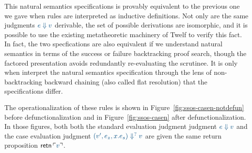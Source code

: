 This natural semantics specifications is provably equivalent to the
previous one we gave when rules are interpreted as inductive
definitions.  Not only are the same judgments $\obj{e \Downarrow v}$
derivable, the set of possible derivations are isomorphic, and it is
possible to use the existing metatheoretic machinery of Twelf to
verify this fact. In fact, the two specfications are also equivalent
if we understand natural semantics in terms of the success or failure
backtracking proof search, though the factored presentation
avoids redundantly re-evaluating the scrutinee. 
It is only when interpret the natural semantics
specification through the lens of non-backtracking backward chaining
(also called flat resolution) that the specifications differ.

The operationalization of these rules is shown in 
Figure~\ref{fig:ssos-casen-notdefun} before defunctionalization
and in Figure~\ref{fig:ssos-casen} after defunctionalization.
In those figures, both  both the standard evaluation judgment
judgment $\obj{e \Downarrow v}$ and the case evaluation judgment
 $\obj{(v',e_z,x.e_s) \Downarrow^?v}$ are given the same return
proposition ${\sf retn}\,\interp{v}$. 






